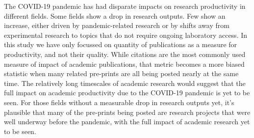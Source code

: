 \documentclass[a4paper,12pt]{article}
\makeatletter
\newcommand{\todo}[1]{\textcolor{red}{#1}}
\newcommand\removebibheader
  {\@{}
    {\section*{}%
     \@{}{}%
    }{}{}{}%
  }
\makeatother
\begin{document}


The COVID-19 pandemic has had disparate impacts on research productivity in different fields. Some fields show a drop in research outputs. Few show an increase, either driven by pandemic-related research or by shifts away from experimental research to topics that do not require ongoing laboratory access. In this study we have only focussed on quantity of publications as a measure for productivity, and not their quality. While citations are the most commonly used measure of impact of academic publications, that metric becomes a more biased statistic when many related pre-prints are all being posted nearly at the same time. 
The relatively long timescales of academic research would suggest that the full impact on academic productivity due to the COVID-19 pandemic is yet to be seen. For those fields without a measurable drop in research outputs yet, it's plausible that many of the pre-prints being posted are research projects that were well underway before the pandemic, with the full impact of academic research yet to be seen.








\end{document}
